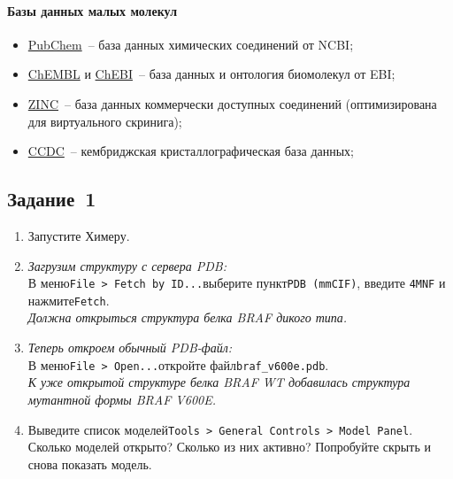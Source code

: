 \paragraph{Базы данных малых молекул}
\begin{itemize}
    \item \href{https://pubchem.ncbi.nlm.nih.gov/}{PubChem}~-- база данных химических соединений от NCBI;
    \item \href{https://www.ebi.ac.uk/chembl/}{ChEMBL} и \href{https://www.ebi.ac.uk/chebi/}{ChEBI}~-- база данных и онтология биомолекул от EBI;
    \item \href{http://zinc15.docking.org}{ZINC}~-- база данных коммерчески доступных соединений (оптимизирована для виртуального скринига);
    \item \href{https://www.ccdc.cam.ac.uk}{CCDC}~-- кембриджская кристаллографическая база данных;
\end{itemize}

\subsection*{Задание~1}
\begin{enumerate}
    \item Запустите Химеру.
    
    \item \textit{Загрузим структуру с сервера PDB:}\\
        В меню\quad\texttt{File~> Fetch by ID...}\quad выберите пункт\quad\texttt{PDB (mmCIF)}, введите \texttt{4MNF}
        и нажмите\quad\texttt{Fetch}.\\
        \textit{Должна открыться структура белка BRAF дикого типа.}
    
    \item \textit{Теперь откроем обычный PDB-файл:}\\
        В меню\quad\texttt{File~> Open...}\quad откройте файл\quad\texttt{braf\_v600e.pdb}.\\
        \textit{К уже открытой структуре белка BRAF WT добавилась структура мутантной формы BRAF V600E.} 
        
    \item Выведите список моделей\quad\texttt{Tools~> General Controls~> Model Panel}.\\
        Сколько моделей открыто? Сколько из них активно? Попробуйте скрыть и снова показать модель.
\end{enumerate}

